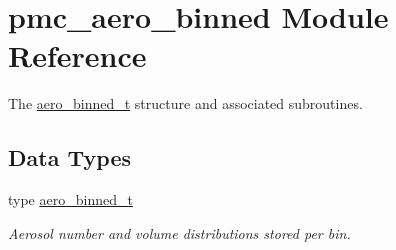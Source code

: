 \hypertarget{namespacepmc__aero__binned}{}\section{pmc\+\_\+aero\+\_\+binned Module Reference}
\label{namespacepmc__aero__binned}


The \mbox{\hyperlink{structpmc__aero__binned_1_1aero__binned__t}{aero\+\_\+binned\+\_\+t}} structure and associated subroutines.  


\subsection*{Data Types}
\begin{DoxyCompactItemize}
\item 
type \mbox{\hyperlink{structpmc__aero__binned_1_1aero__binned__t}{aero\+\_\+binned\+\_\+t}}
\begin{DoxyCompactList}\small\item\em Aerosol number and volume distributions stored per bin. \end{DoxyCompactList}\end{DoxyCompactItemize}
